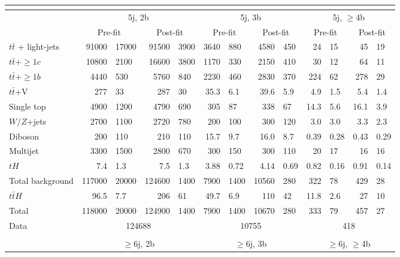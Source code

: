 \begin{table}[htbp]
\begin{footnotesize}
{\begin{tabular}{|l ||  r@{$~\pm~$}l |  r@{$~\pm~$}l ||  r@{$~\pm~$}l  | r@{$~\pm~$}l || r@{$~\pm~$}l | r@{$~\pm~$}l |}
    \hline 
    \multicolumn {13}{|c|}{}\\
    \hline
    & \multicolumn{4}{c||}{5j, 2b} & \multicolumn{4}{c||}{5j, 3b} & \multicolumn{4}{c|}{5j, $\ge$4b} \\
    & \multicolumn{2}{c|}{Pre-fit} & \multicolumn{2}{c||}{Post-fit} & \multicolumn{2}{c|}{Pre-fit} & \multicolumn{2}{c||}{Post-fit} & \multicolumn{2}{c|}{Pre-fit} & \multicolumn{2}{c|}{Post-fit} \\
    \hline
    $t\bar{t}$ + light-jets & 91000&17000 &  91500&3900  & 3640&880 &  4580&450  & 24&15 &  45&19  \\
    $t\bar{t}+\ge1c$   & 10800&2100 &  16600&3800 & 1170&330  &  2150&410  & 30&12     &  64&11  \\
    $t\bar{t}+\ge1b$   & 4440&530   &  5760&840   & 2230&460  &  2830&370  & 224&62    &  278&29  \\
    $t\bar{t}$+V & 277&33     &  287&30     & 35.3&6.1  &  39.6&5.9  & 4.9&1.5   &  5.4&1.4  \\
    Single top & 4900&1200  &  4790&690   & 305&87    &  338&67    & 14.3&5.6  &  16.1&3.9  \\
    $W/Z$+jets & 2700&1100  &  2720&780   & 200&100   &  300&120   & 3.0&3.0   &  3.3&2.3  \\
    Diboson    & 200&110    &  210&110    & 15.7&9.7  &  16.0&8.7  & 0.39&0.28 &  0.43&0.29  \\
    Multijet & 3300&1500  &  2800&670   & 300&150   &  300&110   & 20&17     &  16&16  \\
    $tH$       & 7.4&1.3    &   7.5&1.3   & 3.88&0.72 &  4.14&0.69 & 0.82&0.16 &  0.91&0.14   \\
    \hline
    Total background & 117000&20000 &  124600&1400 &  7900&1400 &  10560&280  & 322&78 &  429&28 \\
    \hline
    $t\bar{t}H$     & 96.5&7.7   &   206&61    & 49.7&6.9  &   110&42   & 11.8&2.6  &    27&10   \\
    \hline
    Total            & 118000&20000 &  124900&1400 &  7900&1400 &  10670&280  & 333&79 &  457&27  \\
    \hline
    Data & \multicolumn{4}{c||}{124688} & \multicolumn{4}{c||}{10755} & \multicolumn{4}{c|}{418} \\
    \hline 
    \multicolumn {13}{|c|}{}\\
    \hline
    & \multicolumn{4}{c||}{$\ge$6j, 2b} & \multicolumn{4}{c||}{$\ge$6j, 3b} & \multicolumn{4}{c|}{$\ge$6j, $\ge$4b} \\

\end{tabular}}
\end{footnotesize}
\end{table}
